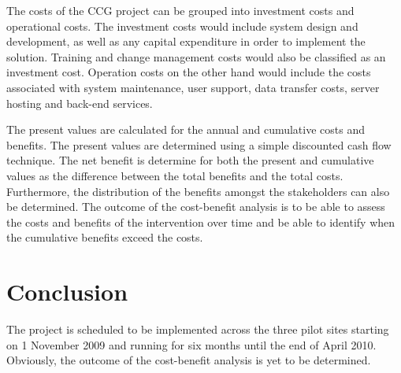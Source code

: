 The costs of the CCG project can be grouped into investment costs and 
operational costs. The investment costs would include system design and 
development, as well as any capital expenditure in order to implement the 
solution. Training and change management costs would also be classified 
as an investment cost. Operation costs on the other hand would include 
the costs associated with system maintenance, user support, data transfer 
costs, server hosting and back-end services.
 
The present values are calculated for the annual and cumulative 
costs and benefits. The present values are determined using a simple 
discounted cash flow technique. The net benefit is determine for both the 
present and cumulative values as the difference between the total  
benefits and the total costs. Furthermore, the distribution of the 
benefits amongst the stakeholders can also be determined.
The outcome of the cost-benefit analysis is to be able to assess the 
costs and benefits of the intervention over time and be able to identify 
when the cumulative benefits exceed the costs.
   
\section*{Conclusion}

The project is scheduled to be implemented across the three pilot 
sites starting on 1 November 2009 and running for six months until 
the end of April 2010. Obviously, the outcome of the cost-benefit 
analysis is yet to be determined.  